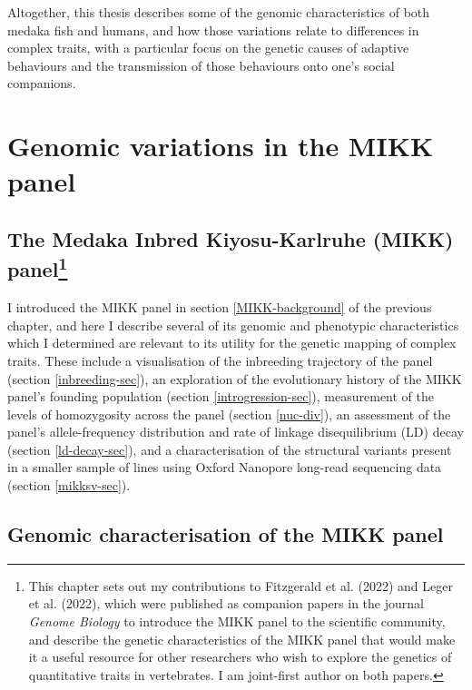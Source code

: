 \documentclass[
]{book}
\begin{document}
Altogether, this thesis describes some of the genomic characteristics of both medaka fish and humans, and how those variations relate to differences in complex traits, with a particular focus on the genetic causes of adaptive behaviours and the transmission of those behaviours onto one's social companions.

\hypertarget{MIKK-genomes-chap}{%
\chapter{Genomic variations in the MIKK panel}\label{MIKK-genomes-chap}}

\hypertarget{the-medaka-inbred-kiyosu-karlruhe-mikk-panel}{%
\section[The Medaka Inbred Kiyosu-Karlruhe (MIKK) panel]{\texorpdfstring{The Medaka Inbred Kiyosu-Karlruhe (MIKK) panel\footnote{This chapter sets out my contributions to Fitzgerald et al. (2022) and Leger et al. (2022), which were published as companion papers in the journal \emph{Genome Biology} to introduce the MIKK panel to the scientific community, and describe the genetic characteristics of the MIKK panel that would make it a useful resource for other researchers who wish to explore the genetics of quantitative traits in vertebrates. I am joint-first author on both papers.}}{The Medaka Inbred Kiyosu-Karlruhe (MIKK) panel}}\label{the-medaka-inbred-kiyosu-karlruhe-mikk-panel}}

I introduced the MIKK panel in section \ref{MIKK-background} of the previous chapter, and here I describe several of its genomic and phenotypic characteristics which I determined are relevant to its utility for the genetic mapping of complex traits. These include a visualisation of the inbreeding trajectory of the panel (section \ref{inbreeding-sec}), an exploration of the evolutionary history of the MIKK panel's founding population (section \ref{introgression-sec}), measurement of the levels of homozygosity across the panel (section \ref{nuc-div}), an assessment of the panel's allele-frequency distribution and rate of linkage disequilibrium (LD) decay (section \ref{ld-decay-sec}), and a characterisation of the structural variants present in a smaller sample of lines using Oxford Nanopore long-read sequencing data (section \ref{mikksv-sec}).

\hypertarget{genomic-characterisation-of-the-mikk-panel}{%
\section{Genomic characterisation of the MIKK panel}\label{genomic-characterisation-of-the-mikk-panel}}
\end{document}
